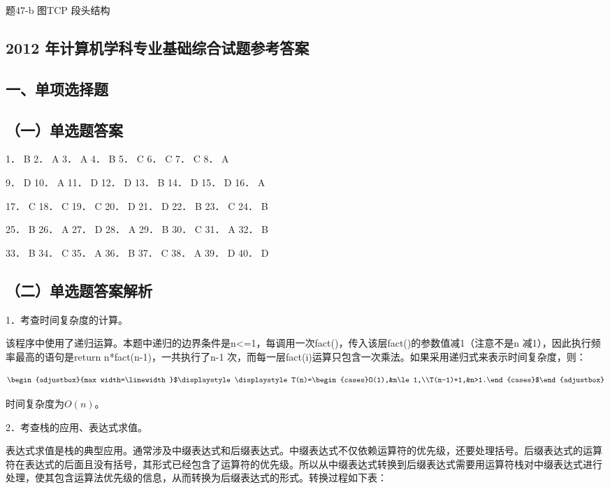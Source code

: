 \documentclass[UTF8,11pt]{ctexart}
\newcommand{\fitmath}[1]{\begin{adjustbox}{max width=\linewidth}$\displaystyle #1$\end{adjustbox}}
\begin{document}
题47-b 图TCP 段头结构


\subsection*{2012 年计算机学科专业基础综合试题参考答案}

\subsection*{一、单项选择题}

\subsection*{（一）单选题答案}

1． B 2． A 3． A 4． B 5． C 6． C 7． C 8． A


9． D 10． A 11． D 12． D 13． B 14． D 15． D 16． A


17． C 18． C 19． C 20． D 21． D 22． B 23． C 24． B


25． B 26． A 27． D 28． A 29． B 30． C 31． A 32． B


33． B 34． C 35． A 36． B 37． C 38． A 39． D 40． D


\subsection*{（二）单选题答案解析}

1．考查时间复杂度的计算。


该程序中使用了递归运算。本题中递归的边界条件是n<=1，每调用一次fact()，传入该层fact()的参数值减1（注意不是n 减1），因此执行频率最高的语句是return n*fact(n-1)，一共执行了n-1 次，而每一层fact(i)运算只包含一次乘法。如果采用递归式来表示时间复杂度，则：


\[\fitmath{\displaystyle T(n)=\begin{cases}O(1),&n\le 1,\\T(n-1)+1,&n>1.\end{cases}}\]

时间复杂度为\(\displaystyle O(n)\)。


2．考查栈的应用、表达式求值。


表达式求值是栈的典型应用。通常涉及中缀表达式和后缀表达式。中缀表达式不仅依赖运算符的优先级，还要处理括号。后缀表达式的运算符在表达式的后面且没有括号，其形式已经包含了运算符的优先级。所以从中缀表达式转换到后缀表达式需要用运算符栈对中缀表达式进行处理，使其包含运算法优先级的信息，从而转换为后缀表达式的形式。转换过程如下表：
\end{document}

